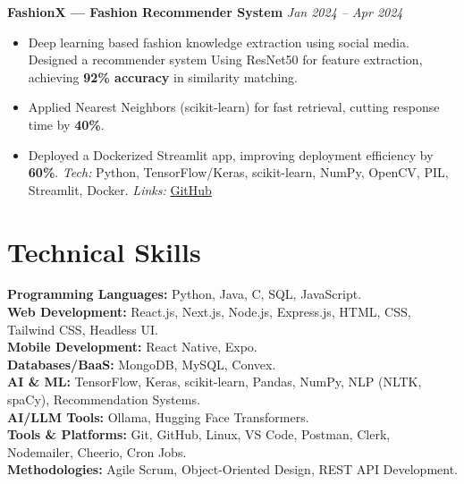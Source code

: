 \documentclass[10pt,a4paper]{article}
\begin{document}
	\textbf{FashionX — Fashion Recommender System} \hfill \textit{Jan 2024 -- Apr 2024}
	\begin{itemize}
		\item Deep learning based fashion knowledge extraction using social media. Designed a recommender system Using ResNet50 for feature extraction, achieving \textbf{92\% accuracy} in similarity matching.  
		\item Applied Nearest Neighbors (scikit-learn) for fast retrieval, cutting response time by \textbf{40\%}.  
		\item Deployed a Dockerized Streamlit app, improving deployment efficiency by \textbf{60\%}.  
		\emph{Tech:} Python, TensorFlow/Keras, scikit-learn, NumPy, OpenCV, PIL, Streamlit, Docker.   
		\emph{Links:} \href{https://github.com/ValupadasuSaiabbhiram/FashionX}{GitHub}
	\end{itemize}
	
	\section*{Technical Skills}
	
	\textbf{Programming Languages:} Python, Java, C, SQL, JavaScript.\\[0.25em]
	\textbf{Web Development:} React.js, Next.js, Node.js, Express.js, HTML, CSS, Tailwind CSS, Headless UI.\\[0.25em]
	\textbf{Mobile Development:} React Native, Expo.\\[0.25em]
	\textbf{Databases/BaaS:} MongoDB, MySQL, Convex.\\[0.25em]
	\textbf{AI \& ML:} TensorFlow, Keras, scikit-learn, Pandas, NumPy, NLP (NLTK, spaCy), Recommendation Systems.\\[0.25em]
	\textbf{AI/LLM Tools:} Ollama, Hugging Face Transformers.\\[0.25em]
	\textbf{Tools \& Platforms:} Git, GitHub, Linux, VS Code, Postman, Clerk, Nodemailer, Cheerio, Cron Jobs.\\[0.25em]
	\textbf{Methodologies:} Agile Scrum, Object-Oriented Design, REST API Development.
	
\end{document}
